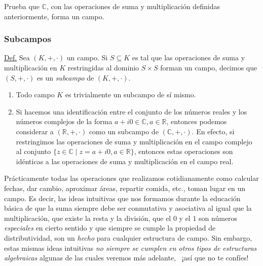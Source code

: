 \documentclass[apuntes]{subfiles}
\begin{document}
\begin{ejer}\label{ejercicio-3}
    Prueba que $\mathbb{C}$, con las operaciones de suma y multiplicación definidas anteriormente, forma un campo.
\end{ejer}


\subsubsection*{Subcampos} \label{Sssec: Subcampos}

\begin{tcolorbox}\label{Def: subcampo}
    
    \underline{Def.} Sea $(K,+,\cdot)$ un campo. Si $S\subseteq K$ es tal que las operaciones de suma y multiplicación en $K$ restringidas al dominio $S\times S$ forman un campo, decimos que $(S,+,\cdot)$ es un \emph{subcampo} de $(K,+,\cdot)$.
\end{tcolorbox}

\begin{Obs}\label{obs:1.4}
    \begin{enumerate}[label=(\arabic*)]\leavevmode
    
        \item Todo campo $K$ es trivialmente un subcampo de sí mismo.

        \item Si hacemos una identificación entre el conjunto de los números reales y los números complejos de la forma $a+i0\in\mathbb{C}, a\in\mathbb{R}$, entonces podemos considerar a $(\mathbb{R},+,\cdot)$ como un subcampo de $(\mathbb{C},+,\cdot)$. En efecto, si restringimos las operaciones de suma y multiplicación en el campo complejo al conjunto $\{z\in\mathbb{C}\mid z = a+i0, a\in\mathbb{R}\}$, entonces estas operaciones son idénticas a las operaciones de suma y multiplicación en el campo real.
    \end{enumerate}
\end{Obs}

Prácticamente todas las operaciones que realizamos cotidianamente como calcular fechas, dar cambio, aproximar áreas, repartir comida, etc., toman lugar en un campo. Es decir, las ideas intuitivas que nos formamos durante la educación básica de que la suma siempre debe ser conmutativa y asociativa \textemdash al igual que la multiplicación\textemdash, que existe la resta y la división, que el $0$ y el $1$ son números \emph{especiales} en cierto sentido y que siempre se cumple la propiedad de distributividad, son un \emph{hecho} para cualquier estructura de campo. Sin embargo, estas mismas ideas intuitivas \emph{no siempre se cumplen en otros tipos de estructuras algebraicas} \textemdash algunas de las cuales veremos más adelante\textemdash, \ ¡así que no te confíes!
\end{document}
